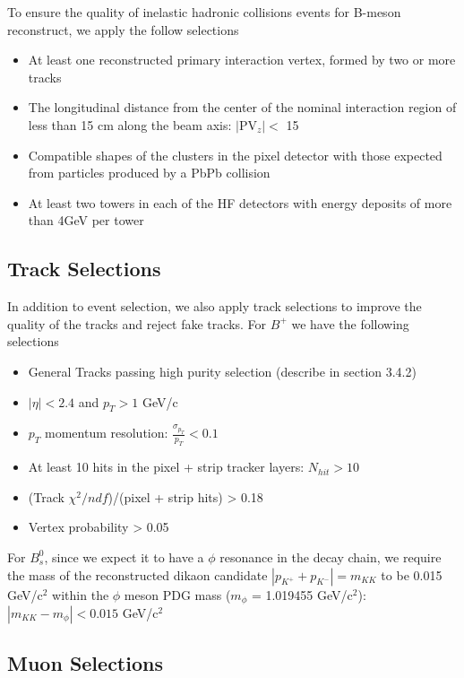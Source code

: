 To ensure the quality of inelastic hadronic collisions events for B-meson reconstruct, we apply the follow selections


\begin{itemize}
\item At least one reconstructed primary interaction vertex, formed by two or more tracks
\item The longitudinal distance from the center of the nominal interaction region of less than 15 cm along the beam axis: $|$PV$_{z}$$| < $ 15
\item Compatible shapes of the clusters in the pixel detector with those expected from particles produced by a PbPb collision \cite{EvtSel}
\item At least two towers in each of the HF detectors with energy deposits of more than 4GeV per tower  
\end{itemize}

\subsection{Track Selections}

In addition to event selection, we also apply track selections to improve the quality of the tracks and reject fake tracks. For $B^+$ we have the following selections

\begin{itemize}
\item General Tracks passing high purity selection (describe in section 3.4.2)
\item $|\eta| < 2.4$ and $p_T > 1$ GeV/c
\item $p_T$ momentum resolution: $\frac{\sigma_{p_T}}{p_T} < 0.1$
\item At least 10 hits in the pixel + strip tracker layers: $N_{hit} > 10$
\item (Track $\chi^2/ndf$)/(pixel + strip hits) > 0.18
\item Vertex probability > 0.05
\end{itemize}

For $B^0_s$, since we expect it to have a $\phi$ resonance in the decay chain, we require the mass of the reconstructed dikaon candidate $|p_{K^+} + p_{K^-}| = m_{KK}$ to be 0.015 GeV/c$^2$ within the $\phi$ meson PDG mass ($m_\phi$ = 1.019455 GeV/c$^2$): $|m_{KK} - m_\phi| < 0.015$ GeV/c$^2$

\subsection{Muon Selections}

